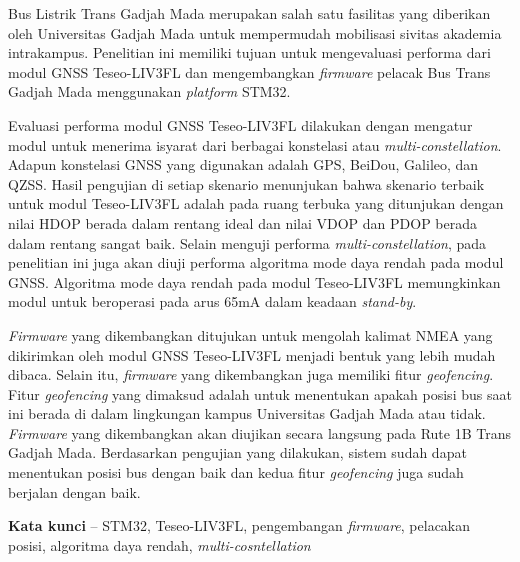 Bus Listrik Trans Gadjah Mada merupakan salah satu fasilitas yang diberikan oleh Universitas Gadjah Mada untuk mempermudah mobilisasi sivitas akademia intrakampus. Penelitian ini memiliki tujuan untuk mengevaluasi performa dari modul GNSS Teseo-LIV3FL dan mengembangkan \textit{firmware} pelacak Bus Trans Gadjah Mada menggunakan \textit{platform} STM32.

Evaluasi performa modul GNSS Teseo-LIV3FL dilakukan dengan mengatur modul untuk menerima isyarat dari berbagai konstelasi atau \textit{multi-constellation}. Adapun konstelasi GNSS yang digunakan adalah GPS, BeiDou, Galileo, dan QZSS. Hasil pengujian di setiap skenario menunjukan bahwa skenario terbaik untuk modul Teseo-LIV3FL adalah pada ruang terbuka yang ditunjukan dengan nilai HDOP berada dalam rentang ideal dan nilai VDOP dan PDOP berada dalam rentang sangat baik. Selain menguji performa \textit{multi-constellation}, pada penelitian ini juga akan diuji performa algoritma mode daya rendah pada modul GNSS. Algoritma mode daya rendah pada modul Teseo-LIV3FL memungkinkan modul untuk beroperasi pada arus 65mA dalam keadaan \textit{stand-by}.

\textit{Firmware} yang dikembangkan ditujukan untuk mengolah kalimat NMEA yang dikirimkan oleh modul GNSS Teseo-LIV3FL menjadi bentuk yang lebih mudah dibaca. Selain itu, \textit{firmware} yang dikembangkan juga memiliki fitur \textit{geofencing}. Fitur \textit{geofencing} yang dimaksud adalah untuk menentukan apakah posisi bus saat ini berada di dalam lingkungan kampus Universitas Gadjah Mada atau tidak. \textit{Firmware} yang dikembangkan akan diujikan secara langsung pada Rute 1B Trans Gadjah Mada. Berdasarkan pengujian yang dilakukan, sistem sudah dapat menentukan posisi bus dengan baik dan kedua fitur \textit{geofencing} juga sudah berjalan dengan baik.

\noindent\textbf{Kata kunci} -- STM32, Teseo-LIV3FL, pengembangan \textit{firmware}, pelacakan posisi, algoritma daya rendah, \textit{multi-cosntellation}